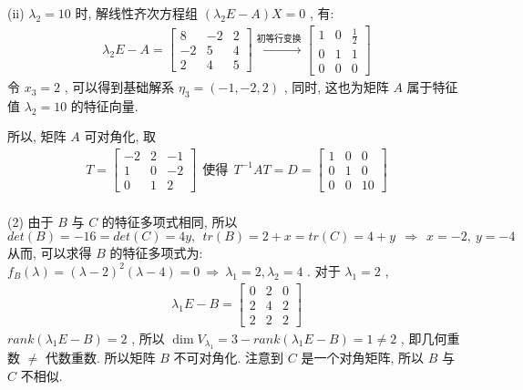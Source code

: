 \documentclass[11pt,a4paper,openany,oneside]{book}
\begin{document}
(ii) $ \lambda_2 = 10 $ 时, 解线性齐次方程组 $ (\lambda_2E-A)X = 0 $ , 有:
\begin{gather*}
\lambda_2E-A=
\begin{bmatrix}
8  &  -2  &  2  \\
-2  &  5  &  4  \\
2  &  4  &  5  
\end{bmatrix} \xrightarrow{初等行变换}
\begin{bmatrix}
1  &  0  &  \frac{1}{2}  \\
0  &  1  &  1  \\
0  &  0  &  0
\end{bmatrix}
\end{gather*}
令 $ x_3 = 2 $ , 可以得到基础解系 $ \eta_3 = (-1, -2, 2) $ , 同时, 这也为矩阵 $ A $ 属于特征值 $ \lambda_2=10 $ 的特征向量. 

所以, 矩阵 $ A $ 可对角化, 取
\begin{gather*}
T = 
\begin{bmatrix}
-2  &  2  &  -1  \\
1  &  0  &  -2  \\
0  &  1  &  2
\end{bmatrix} \ \ \text{使得} \ \ T^{-1}AT =D =
\begin{bmatrix}
1  &  0  &  0  \\
0  &  1  &  0  \\
0  &  0  &  10
\end{bmatrix}
\end{gather*}   \\ 

(2) 由于 $ B $ 与 $ C $ 的特征多项式相同, 所以
 $$  det(B)= -16 = det(C) = 4y, \ \ tr(B) = 2+x = tr(C) = 4+y \ \ \Rightarrow \ \ x = -2,\  y=-4   $$ 
从而, 可以求得 $ B $ 的特征多项式为: $ f_B(\lambda) = (\lambda-2)^2(\lambda-4)=0 \ \Rightarrow \ \lambda_1 = 2, \lambda_2 = 4 $ .
对于 $ \lambda_1=2 $ , 
\begin{gather*}
\lambda_1E - B =
\begin{bmatrix}
0  &  2  &  0  \\
2  &  4  &  2  \\
2  &  2  &  2
\end{bmatrix}
\end{gather*}
 $ rank(\lambda_1E-B) = 2 $ , 所以 $ \dim V_{\lambda_1} = 3 - rank(\lambda_1E-B)=1 \neq 2 $ , 即几何重数 $ \neq $ 代数重数. 所以矩阵 $ B $ 不可对角化. 注意到 $ C $ 是一个对角矩阵, 所以 $ B $ 与 $ C $ 不相似.
\\  \\  \\
\end{document}
